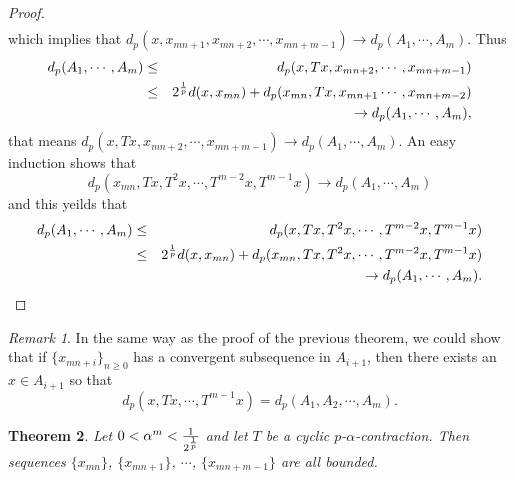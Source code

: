 \documentclass{amsart}
\newtheorem{theorem}{Theorem}[section]
\theoremstyle{definition}
\theoremstyle{remark}
\newtheorem{remark}[theorem]{Remark}
\begin{document}
\begin{proof}
\begin{eqnarray*}
\end{eqnarray*}
which implies that $d_p(x,x_{mn+1},x_{mn+2},\cdots,x_{mn+m-1})\to d_p(A_1,\cdots,A_m)$.
Thus
\begin{eqnarray*}
d_p(A_1,\cdots,A_m)&\leq& d_p(x,Tx,x_{mn+2},\cdots,x_{mn+m-1})\\
&\leq&2^{1\over p}d(x,x_{mn})+d_p(x_{mn},Tx,x_{mn+1}\cdots,x_{mn+m-2})\\&&\to d_p(A_1,\cdots,A_m),
\end{eqnarray*}
that means $ d_p(x,Tx,x_{mn+2},\cdots,x_{mn+m-1})\to d_p(A_1,\cdots,A_m).$ An easy induction shows that $$d_p(x_{mn},Tx,T^2x,\cdots,T^{m-2}x,T^{m-1}x)\to d_p(A_1,\cdots,A_m)$$
and this yeilds that
\begin{eqnarray*}
d_p(A_1,\cdots,A_m)&\leq&d_p(x,Tx,T^2x,\cdots,T^{m-2}x,T^{m-1}x)\\
&\leq&2^{1\over p}d(x,x_{mn})+d_p(x_{mn},Tx,T^2x,\cdots,T^{m-2}x,T^{m-1}x)\\&&\to d_p(A_1,\cdots,A_m).
\end{eqnarray*}
\end{proof}
\begin{remark}In the same way as the proof of the previous theorem, we could show that if $\{x_{mn+i}\}_{n\geq0}$ has a convergent subsequence in $A_{i+1}$, then there exists an $x\in A_{i+1}$ so that $$d_p(x,Tx,\cdots,T^{m-1}x)=d_p(A_1,A_2,\cdots,A_m).$$
\end{remark}
\begin{theorem}\label{MET1}
Let $0<\alpha^m<{1\over{2^{1\over p}}}$ and let $T$ be a cyclic $p$-$\alpha$-contraction. Then sequences $\{x_{mn}\}$, $\{x_{mn+1}\}$, $\cdots$, $\{x_{mn+m-1}\}$ are all bounded.
\end{theorem}
\end{document}
